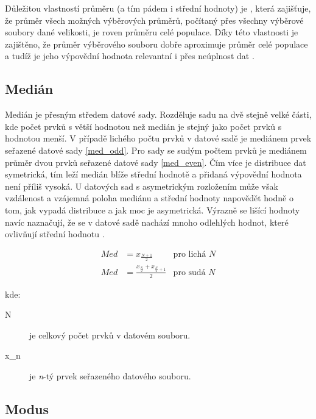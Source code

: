 \noindent Důležitou vlastností průměru (a tím pádem i střední hodnoty) je , která zajišťuje, že průměr všech možných výběrových průměrů, počítaný přes všechny výběrové soubory dané velikosti, je roven průměru celé populace. Díky této vlastnosti je zajištěno, že průměr výběrového souboru dobře aproximuje průměr celé populace a tudíž je jeho výpovědní hodnota relevantní i přes neúplnost dat \cite{zahora}.

\subsection*{Medián}

Medián je přesným středem datové sady. Rozděluje sadu na dvě stejně velké části, kde počet prvků s větší hodnotou než medián je stejný jako počet prvků s hodnotou menší. V případě lichého počtu prvků v datové sadě je mediánem  prvek seřazené datové sady \ref{med_odd}. Pro sady se sudým počtem prvků je mediánem průměr dvou  prvků seřazené datové sady \ref{med_even}.
Čím více je distribuce dat symetrická, tím leží medián blíže střední hodnotě a přidaná výpovědní hodnota není příliš vysoká. U datových sad s asymetrickým rozložením může však vzdálenost a vzájemná poloha mediánu a střední hodnoty napovědět hodně o tom, jak vypadá distribuce a jak moc je asymetrická. Výrazně se lišící hodnoty navíc naznačují, že se v datové sadě nachází mnoho odlehlých hodnot, které ovlivňují střední hodnotu \cite{skiena}.


\begin{align}
    & & Med & =  x_{\frac{N+1}{2}} & \text{pro lichá } N & &  \label{med_odd}\\
    & & Med & =  \frac{x_{\frac{N}{2}}+x_{\frac{N}{2}+1}}{2} & \text{pro sudá } N & & \label{med_even}
\end{align}

\noindent kde:



\begin{description}
    \item[N] je celkový počet prvků v datovém souboru.
    \item[x_n] je \emph{n}-tý prvek seřazeného datového souboru.
\end{description}


\subsection*{Modus}

